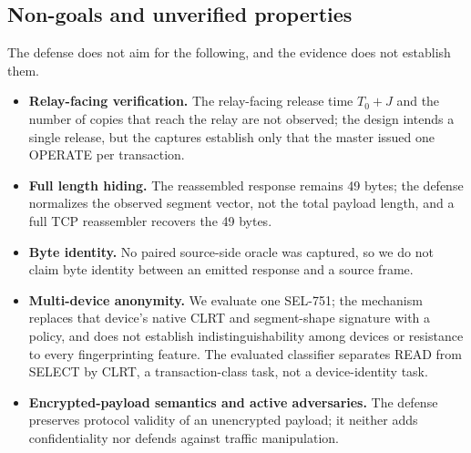 \subsection{Non-goals and unverified properties}
The defense does not aim for the following, and the evidence does not establish them.
\begin{itemize}
\item \textbf{Relay-facing verification.} The relay-facing release time $T_0{+}J$ and the number of
copies that reach the relay are not observed; the design intends a single release, but the captures
establish only that the master issued one OPERATE per transaction.
\item \textbf{Full length hiding.} The reassembled response remains 49 bytes; the defense normalizes
the observed segment vector, not the total payload length, and a full TCP reassembler recovers the 49
bytes.
\item \textbf{Byte identity.} No paired source-side oracle was captured, so we do not claim byte
identity between an emitted response and a source frame.
\item \textbf{Multi-device anonymity.} We evaluate one SEL-751; the mechanism replaces that device's
native CLRT and segment-shape signature with a policy, and does not establish indistinguishability
among devices or resistance to every fingerprinting feature. The evaluated classifier separates READ
from SELECT by CLRT, a transaction-class task, not a device-identity task.
\item \textbf{Encrypted-payload semantics and active adversaries.} The defense preserves protocol
validity of an unencrypted payload; it neither adds confidentiality nor defends against traffic
manipulation.
\end{itemize}
